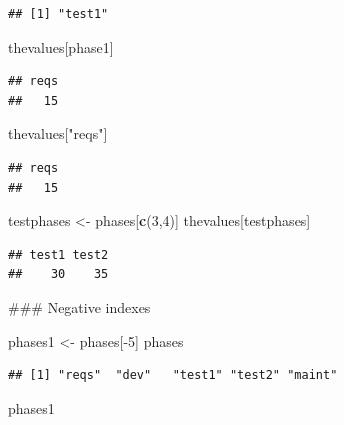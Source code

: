 \documentclass[]{book}
\newenvironment{Shaded}{\begin{snugshade}}{\end{snugshade}}
\newcommand{\KeywordTok}[1]{\textcolor[rgb]{0.13,0.29,0.53}{\textbf{{#1}}}}
\newcommand{\DecValTok}[1]{\textcolor[rgb]{0.00,0.00,0.81}{{#1}}}
\newcommand{\StringTok}[1]{\textcolor[rgb]{0.31,0.60,0.02}{{#1}}}
\newcommand{\NormalTok}[1]{{#1}}
\begin{document}
\begin{verbatim}
## [1] "test1"
\end{verbatim}

\begin{Shaded}
\begin{Highlighting}[]
\NormalTok{thevalues[phase1]}
\end{Highlighting}
\end{Shaded}

\begin{verbatim}
## reqs 
##   15
\end{verbatim}

\begin{Shaded}
\begin{Highlighting}[]
\NormalTok{thevalues[}\StringTok{"reqs"}\NormalTok{]}
\end{Highlighting}
\end{Shaded}

\begin{verbatim}
## reqs 
##   15
\end{verbatim}

\begin{Shaded}
\begin{Highlighting}[]
\NormalTok{testphases <-}\StringTok{ }\NormalTok{phases[}\KeywordTok{c}\NormalTok{(}\DecValTok{3}\NormalTok{,}\DecValTok{4}\NormalTok{)]}
\NormalTok{thevalues[testphases]}
\end{Highlighting}
\end{Shaded}

\begin{verbatim}
## test1 test2 
##    30    35
\end{verbatim}

\begin{Shaded}
\begin{Highlighting}[]
\NormalTok{### Negative indexes}

\NormalTok{phases1 <-}\StringTok{ }\NormalTok{phases[-}\DecValTok{5}\NormalTok{]}
\NormalTok{phases}
\end{Highlighting}
\end{Shaded}

\begin{verbatim}
## [1] "reqs"  "dev"   "test1" "test2" "maint"
\end{verbatim}

\begin{Shaded}
\begin{Highlighting}[]
\NormalTok{phases1}
\end{Highlighting}
\end{Shaded}
\end{document}
